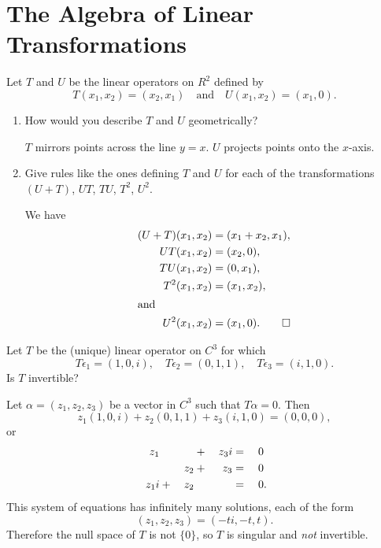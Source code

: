 \section{The Algebra of Linear Transformations}

 Let $T$ and $U$ be the linear operators on $R^2$ defined by
\begin{equation*}
  T(x_1,x_2) = (x_2,x_1) \quad\text{and}\quad
  U(x_1,x_2) = (x_1,0).
\end{equation*}
\begin{enumerate}
\item How would you describe $T$ and $U$ geometrically?
  \begin{solution}
    $T$ mirrors points across the line $y = x$. $U$ projects points
    onto the $x$-axis.
  \end{solution}

\item Give rules like the ones defining $T$ and $U$ for each of the
  transformations $(U + T)$, $UT$, $TU$, $T^2$, $U^2$.
  \begin{solution}
    We have
    \begin{align*}
      (U + T)(x_1,x_2) &= (x_1 + x_2, x_1), \\
      UT(x_1,x_2) &= (x_2, 0), \\
      TU(x_1,x_2) &= (0, x_1), \\
      T^2(x_1,x_2) &= (x_1,x_2), \\
      \intertext{and}
      U^2(x_1,x_2) &= (x_1,0). \qedhere
    \end{align*}
  \end{solution}
\end{enumerate}

 Let $T$ be the (unique) linear operator on $C^3$ for which
\begin{equation*}
  T\epsilon_1 = (1, 0, i), \quad
  T\epsilon_2 = (0, 1, 1), \quad
  T\epsilon_3 = (i, 1, 0).
\end{equation*}
Is $T$ invertible?
\begin{solution}
  Let $\alpha = (z_1,z_2,z_3)$ be a vector in $C^3$ such that
  $T\alpha = 0$. Then
  \begin{equation*}
    z_1(1, 0, i) + z_2(0, 1, 1) + z_3(i, 1, 0) = (0, 0, 0),
  \end{equation*}
  or
  \begin{alignat*}{4}
    z_1 && &{}+{}& z_3i &{}={}& 0 \\
    && z_2 &{}+{}& z_3 &{}={}& 0 \\
    z_1i &{}+{}& z_2 && &{}={}& 0\rlap.
  \end{alignat*}
  This system of equations has infinitely many solutions, each of the
  form
  \begin{equation*}
    (z_1,z_2,z_3) = (-ti, -t, t).
  \end{equation*}
  Therefore the null space of $T$ is not $\{0\}$, so $T$ is singular
  and {\em not} invertible.
\end{solution}
